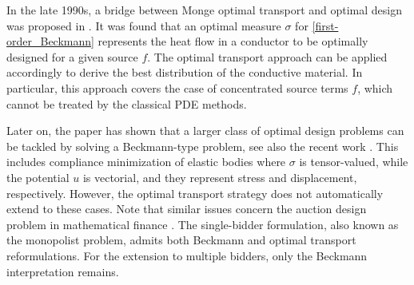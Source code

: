 \documentclass[11pt,letterpaper,reqno]{amsart}
\theoremstyle{definition}
\numberwithin{equation}{section}
\begin{document}
In the late 1990s, a bridge between Monge optimal transport and optimal design was proposed in \cite{BBS1997}. It was found that an optimal measure $\sigma$ for \eqref{first-order_Beckmann} represents the heat flow in a conductor to be optimally designed for a given source $f$. The optimal transport approach can be applied accordingly to derive the best distribution of the conductive material. In particular, this approach covers the case of concentrated source terms $f$, which cannot be treated  by the classical PDE methods.



Later on, the paper \cite{bouchitte2001} has shown that a larger class of optimal design problems can be tackled by solving
a Beckmann-type problem, see also the recent work \cite{bolbotowski2022}. This includes compliance minimization of elastic bodies where $\sigma$ is tensor-valued, while the potential $u$ is vectorial, and they represent stress and displacement, respectively.
 However, the optimal transport strategy does not automatically extend to these cases. Note that  similar issues concern the auction design problem in mathematical finance \cite{kolesnikov2022}. The single-bidder formulation, also known as the monopolist problem, admits both Beckmann and optimal transport reformulations. For the extension to multiple bidders, only the Beckmann interpretation remains.
 
 
 
\end{document}
